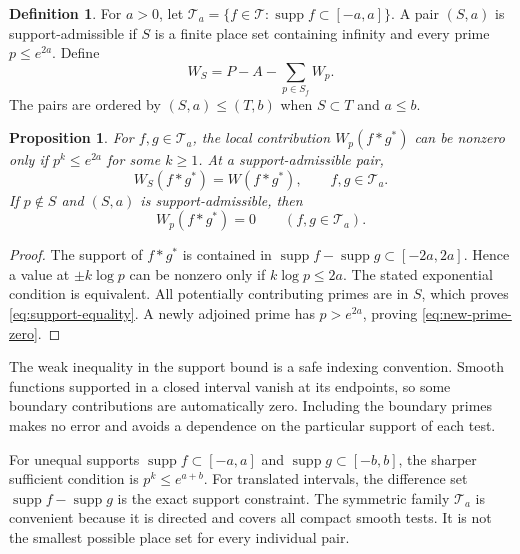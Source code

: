 \documentclass[11pt,letterpaper]{article}
\newtheorem{proposition}[theorem]{Proposition}
\theoremstyle{definition}
\newtheorem{definition}[theorem]{Definition}
\theoremstyle{remark}
\newcommand{\T}{\mathcal T}
\newcommand{\supp}{\operatorname{supp}}
\begin{document}
\begin{definition}\label{def:local-correspondence:support}
For $a>0$, let $\T_a=\{f\in\T:\supp f\subset[-a,a]\}$.
A pair $(S,a)$ is support-admissible if $S$ is a finite place set
containing infinity and every prime $p\le e^{2a}$. Define
\begin{equation}\label{eq:finite-Weil}
 W_S=P-A-\sum_{p\in S_f}W_p.
\end{equation}
The pairs are ordered by $(S,a)\le(T,b)$ when $S\subset T$ and
$a\le b$.
\end{definition}

\begin{proposition}\label{prop:local-correspondence:support}
For $f,g\in\T_a$, the local contribution $W_p(f*g^*)$ can be
nonzero only if $p^k\le e^{2a}$ for some $k\ge1$.
At a support-admissible pair,
\begin{equation}\label{eq:support-equality}
 W_S(f*g^*)=W(f*g^*),\qquad f,g\in\T_a.
\end{equation}
If $p\notin S$ and $(S,a)$ is support-admissible, then
\begin{equation}\label{eq:new-prime-zero}
 W_p(f*g^*)=0\qquad(f,g\in\T_a).
\end{equation}
\end{proposition}

\begin{proof}
The support of $f*g^*$ is contained in
$\supp f-\supp g\subset[-2a,2a]$. Hence a value at
$\pm k\log p$ can be nonzero only if $k\log p\le2a$.
The stated exponential condition is equivalent. All potentially
contributing primes are in $S$, which proves
\eqref{eq:support-equality}. A newly adjoined prime has
$p>e^{2a}$, proving \eqref{eq:new-prime-zero}.
\end{proof}

The weak inequality in the support bound is a safe indexing
convention. Smooth functions supported in a closed interval vanish
at its endpoints, so some boundary contributions are automatically
zero. Including the boundary primes makes no error and avoids a
dependence on the particular support of each test.

For unequal supports $\supp f\subset[-a,a]$ and
$\supp g\subset[-b,b]$, the sharper sufficient condition is
$p^k\le e^{a+b}$. For translated intervals, the difference set
$\supp f-\supp g$ is the exact support constraint. The symmetric
family $\T_a$ is convenient because it is directed and covers all
compact smooth tests. It is not the smallest possible place set
for every individual pair.
\end{document}
